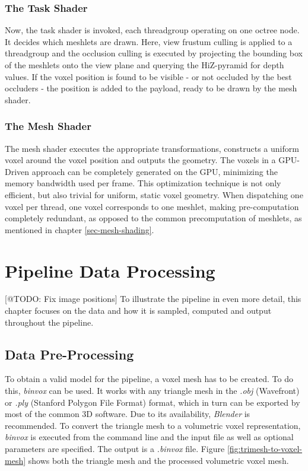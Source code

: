 \subsubsection*{The Task Shader} \label{subsec-task-shader}

Now, the task shader is invoked, each threadgroup operating on one octree node. It decides which 
meshlets are drawn. Here, view frustum culling is applied to a threadgroup and the occlusion culling is 
executed by projecting the bounding box of the meshlets onto the view plane and querying the 
\ac{HiZ}-pyramid for depth values. If the voxel position is found to be visible - or not occluded by 
the best occluders - the position is added to the payload, ready to be drawn by the mesh shader. 


\subsubsection*{The Mesh Shader} \label{subsec-mesh-shader}

The mesh shader executes the appropriate transformations, constructs a uniform voxel around the voxel position 
and outputs the geometry. The voxels in a \ac{GPU}-Driven approach can be completely generated on the \ac{GPU}, 
minimizing the memory bandwidth used per frame. This optimization technique is not only efficient, but also 
trivial for uniform, static voxel geometry. When dispatching one voxel per thread, one voxel corresponds 
to one meshlet, making pre-computation completely redundant, as opposed to the common precomputation of meshlets, 
as mentioned in chapter \ref{sec-mesh-shading}. 


\section{Pipeline Data Processing} \label{sec-pipeline-data-processing}

[@TODO: Fix image positions]
To illustrate the pipeline in even more detail, this chapter focuses on the data and how it is sampled, computed 
and output throughout the pipeline.

\subsection*{Data Pre-Processing} \label{subsec-data-pre-processing}

To obtain a valid model for the pipeline, a voxel mesh has to be created. To do this, \emph{binvox} 
\cite{binvox} can be used. It works with any triangle mesh in the \emph{.obj} (Wavefront) or \emph{.ply} 
(Stanford Polygon File Format) format, which in turn can be exported by most of the common 3D software. 
Due to its availability, \emph{Blender} \cite{Blender} is recommended. To convert the triangle mesh to a volumetric 
voxel representation, \emph{binvox} is executed from the command line and the input file as well as optional 
parameters are specified. The output is a \emph{.binvox} file. Figure \ref{fig:trimesh-to-voxel-mesh} shows 
both the triangle mesh and the processed volumetric voxel mesh. 

